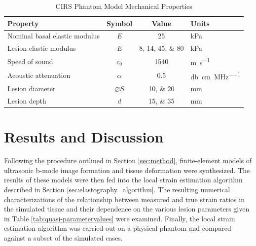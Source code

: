 			\begin{table}[!htb]
				\centering
				\caption{CIRS Phantom Model Mechanical Properties}
				\label{tab:phantomproperties}
				\begin{tabular}{lccs[table-unit-alignment = left]}
					\toprule
					Property & Symbol & Value & Units \\
					\midrule
					Nominal basal elastic modulus & $E$ & 25 & \si{\kPa} \\
					Lesion elastic modulus & $E$ & \numlist{8;14;45;80} & \si{\kPa} \\
					Speed of sound & $c_0$ & 1540 & \si{\metre\per\second} \\
					Acoustic attenuation & $\alpha$ & 0.5 & \si{\decibel\per\cm\per\MHz} \\
					Lesion diameter & $\diameter S$ & \numlist{10;20} & \si{\mm} \\
					Lesion depth & $d$ & \numlist{15;35} & \si{\mm} \\
					\bottomrule
				\end{tabular}
			\end{table}

	\section{Results and Discussion}
		Following the procedure outlined in Section \ref{sec:method}, finite-element models of ultrasonic b-mode image formation and tissue deformation were synthesized. The results of these models were then fed into the local strain estimation algorithm described in Section \ref{sec:elastography_algorithm}. The resulting numerical characterizations of the relationship between measured and true strain ratios in the simulated tissue and their dependence on the various lesion parameters given in Table \ref{tab:quasi-parametervalues} were examined. Finally, the local strain estimation algorithm was carried out on a physical phantom and compared against a subset of the simulated cases.

